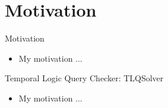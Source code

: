 \section{Motivation}

\begin{frame}{Motivation}
  \begin{itemize}
    \item My motivation ...
  \end{itemize}
\end{frame}

\begin{frame}{Temporal Logic Query Checker: TLQSolver}
  \begin{itemize}
    \item My motivation ...
  \end{itemize}
\end{frame}
